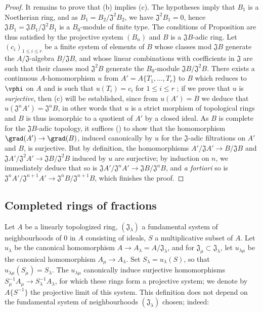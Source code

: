 \begin{proof}
It remains to prove that (b) implies (c). The hypotheses imply that $B_1$ is a Noetherian ring, and
as $B_1=B_2/\mathfrak{J}^2 B_2$, we have $\mathfrak{J}^2 B_1=0$, hence
$\mathfrak{J}B_1=\mathfrak{J}B_1/\mathfrak{J}^2 B_1$ is a $B_0$-module of finite type. The
conditions of Proposition  are thus satisfied by the projective
system $(B_n)$ and $B$ is a $\mathfrak{J}B$-adic ring. Let $(c_i)_{1\leq i\leq r}$ be a
finite system of elements of $B$ whose classes mod $\mathfrak{J}B$ generate the
$A/\mathfrak{J}$-algebra $B/\mathfrak{J}B$, and whose linear combinations with coefficients in
$\mathfrak{J}$ are such that their classes mod $\mathfrak{J}^2 B$ generate the $B_0$-module
$\mathfrak{J}B/\mathfrak{J}^2 B$. There exists a continuous $A$-homomorphism $u$ from
$A'=A\{T_1,\dots,T_r\}$ to $B$ which reduces to $\vphi$ on $A$ and is such that $u(T_i)=c_i$ for
$1\leq i\leq r$ ; if we prove that $u$ is \emph{surjective},
then (c) will be established, since from $u(A')=B$ we deduce that
$u(\mathfrak{J}^n A')=\mathfrak{J}^n B$, in other words that $u$ is a strict morphism of topological
  rings and $B$ is thus isomorphic to a quotient of $A'$ by a closed ideal. As $B$ is complete for the
$\mathfrak{J}B$-adic topology, it suffices (\cite[p.~18--07]{I-1}) to show that the homomorphism
$\grad(A')\to\grad(B)$, induced canonically by $u$ for the $\mathfrak{J}$-adic filtrations on
$A'$ and $B$, is surjective. But by definition, the homomorphisms
$A'/\mathfrak{J}A'\to B/\mathfrak{J}B$ and
$\mathfrak{J}A'/\mathfrak{J}^2 A'\to\mathfrak{J}B/\mathfrak{J}^2 B$ induced by $u$ are surjective;
by induction on $n$, we immediately deduce that so is
$\mathfrak{J}A'/\mathfrak{J}^n A'\to\mathfrak{J}B/\mathfrak{J}^n B$, and \emph{a fortiori} so is
$\mathfrak{J}^n A'/\mathfrak{J}^{n+1}A'\to\mathfrak{J}^n B/\mathfrak{J}^{n+1}B$, which finishes the
proof.
\end{proof}

\subsection{Completed rings of fractions}
\label{subsection:0.7.6}

\begin{env}[7.6.1]
\label{0.7.6.1}
Let $A$ be a linearly topologized ring, $(\mathfrak{J}_\lambda)$ a fundamental system of
neighbourhoods of $0$ in $A$ consisting of ideals, $S$ a multiplicative subset of $A$. Let
$u_\lambda$ be the canonical homomorphism $A\to A_\lambda=A/\mathfrak{J}_\lambda$, and for
$\mathfrak{J}_\mu\subset\mathfrak{J}_\lambda$, let $u_{\lambda\mu}$ be the canonical
homomorphism $A_\mu\to A_\lambda$. Set $S_\lambda=u_\lambda(S)$, so that
$u_{\lambda\mu}(S_\mu)=S_\lambda$. The $u_{\lambda\mu}$ canonically induce surjective
homomorphisms $S_\mu^{-1}A_\mu\to S_\lambda^{-1}A_\lambda$, for which these rings form a
projective system; we denote by $A\{S^{-1}\}$ the projective limit of this system. This
definition does not depend on the fundamental system of neighbourhoods $(\mathfrak{J}_\lambda)$
chosen; indeed:
\end{env}

